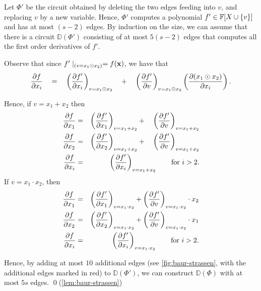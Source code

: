 Let $\Phi'$ be the circuit obtained by deleting the two edges feeding into $v$, and replacing $v$ by a new variable. 
Hence, $\Phi'$ computes a polynomial $f' \in \mathbb{F}[X\cup \left\{v\right\}]$ and has at most $(s-2)$ edges. 
By induction on the size, we can assume that there is a circuit $\mathbb{D}(\Phi')$ consisting of at most $5(s-2)$ edges that computes all the first order derivatives of $f'$.

Observe that since $f'\mid_{(v = x_1 \odot x_2)} = f(\mathbf{x})$,  we have that 
$$
\frac{\partial f}{\partial x_i} \quad = \quad\left(\frac{\partial f'}{\partial x_i}\right)_{v = x_1 \odot x_2} \quad+\quad  \left(\frac{\partial f'}{\partial v}\right)_{v = x_1 \odot x_2}\left(\frac{\partial (x_1 \odot x_2)}{\partial x_i}\right).
$$

Hence, if $v = x_1 + x_2$ then
\begin{eqnarray*}
  \frac{\partial f}{\partial x_1} & = & \left(\frac{\partial f'}{\partial x_1}\right)_{v=x_1 + x_2} +\quad \left(\frac{\partial f'}{\partial v}\right)_{v = x_1 + x_2}\\
  \frac{\partial f}{\partial x_2} & = & \left(\frac{\partial f'}{\partial x_2}\right)_{v=x_1 + x_2} +\quad \left(\frac{\partial f'}{\partial v}\right)_{v = x_1 + x_2}\\
  \frac{\partial f}{\partial x_i} & = & \left(\frac{\partial f'}{\partial x_i}\right)_{v=x_1 + x_2} \qquad\text{for $i>2$}.
\end{eqnarray*}
If $v = x_1 \cdot x_2$, then
\begin{eqnarray*}
  \frac{\partial f}{\partial x_1} & = & \left(\frac{\partial f'}{\partial x_1}\right)_{v=x_1 \cdot x_2} + \left(\frac{\partial f'}{\partial v}\right)_{v = x_1 \cdot x_2} \cdot x_2\\
  \frac{\partial f}{\partial x_2} & = & \left(\frac{\partial f'}{\partial x_2}\right)_{v=x_1 \cdot x_2} + \left(\frac{\partial f'}{\partial v}\right)_{v = x_1\cdot x_2}\cdot x_1\\
  \frac{\partial f}{\partial x_i} & = & \left(\frac{\partial f'}{\partial x_i}\right)_{v=x_1 \cdot x_2} \qquad\text{for $i>2$}.
\end{eqnarray*}

Hence, by adding at most $10$ additional edges (see \autoref{fig:baur-strassen}, with the additional edges marked in red) to $\mathbb{D}(\Phi')$, we can construct $\mathbb{D}(\Phi)$ with at most $5s$ edges. \qed (\autoref{lem:baur-strassen})

